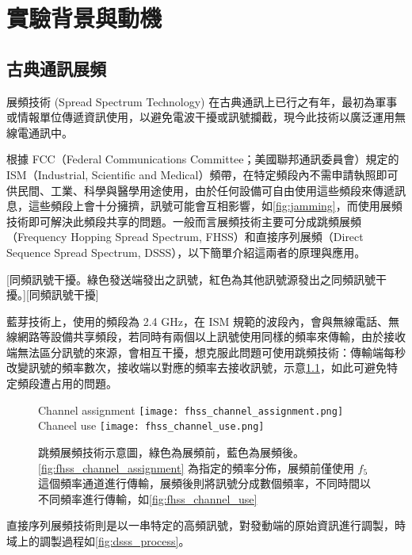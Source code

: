 \documentclass[class=NCU_thesis, crop=false]{standalone}
\begin{document}
\chapter{實驗背景與動機}
\section{古典通訊展頻}
展頻技術 (Spread Spectrum Technology) \cite{simon1985spread,pickholtz1982theory}在古典通訊上已行之有年，最初為軍事或情報單位傳遞資訊使用，以避免電波干擾或訊號攔截，現今此技術以廣泛運用無線電通訊中。

根據 FCC（Federal Communications Committee；美國聯邦通訊委員會）規定的 ISM（Industrial, Scientific and Medical）頻帶，在特定頻段內不需申請執照即可供民間、工業、科學與醫學用途使用，由於任何設備可自由使用這些頻段來傳遞訊息，這些頻段上會十分擁擠，訊號可能會互相影響，如\cref{fig:jamming}，而使用展頻技術即可解決此頻段共享的問題。一般而言展頻技術主要可分成跳頻展頻（Frequency Hopping Spread Spectrum, FHSS）和直接序列展頻（Direct Sequence Spread Spectrum, DSSS），以下簡單介紹這兩者的原理與應用。


[同頻訊號干擾。綠色發送端發出之訊號，紅色為其他訊號源發出之同頻訊號干擾。][同頻訊號干擾]

藍芽技術上，使用的頻段為 2.4 GHz，在 ISM 規範的波段內，會與無線電話、無線網路等設備共享頻段，若同時有兩個以上訊號使用同樣的頻率來傳輸，由於接收端無法區分訊號的來源，會相互干擾，想克服此問題可使用跳頻技術：傳輸端每秒改變訊號的頻率數次，接收端以對應的頻率去接收訊號，示意\cref{fig:fhss}，如此可避免特定頻段遭占用的問題。

\begin{figure}[!hbt]
    \centering
    \subcaptionbox
        {Channel assignment
        \label{fig:fhss_channel_assignment}}
        {\texttt{[image: fhss\_channel\_assignment.png]}}
    ~~~~
    \subcaptionbox
        {Chaneel use
        \label{fig:fhss_channel_use}}
        {\texttt{[image: fhss\_channel\_use.png]}}
    \caption[跳頻展頻技術示意圖]{跳頻展頻技術示意圖，綠色為展頻前，藍色為展頻後。\cref{fig:fhss_channel_assignment} 為指定的頻率分佈，展頻前僅使用 $f_5$ 這個頻率通道進行傳輸，展頻後則將訊號分成數個頻率，不同時間以不同頻率進行傳輸，如\cref{fig:fhss_channel_use}}
    \label{fig:fhss}
\end{figure}

直接序列展頻技術則是以一串特定的高頻訊號，對發動端的原始資訊進行調製，時域上的調製過程如\cref{fig:dsss_process}。
\end{document}
